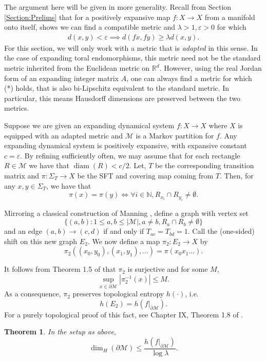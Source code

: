 \documentclass{article}
\def\N{\mathbb{N}}
\def\R{\mathbb{R}}
\def\M{\mathcal{M}}
\newtheorem{theorem}{Theorem}[section]
\begin{document}
The argument here will be given in more generality. Recall from Section \ref{Section:Prelims} that for a positively expansive map $f:X\to X$ from a manifold onto itself, \cite{CR} shows we can find a compatible metric and  $\lambda>1,\varepsilon>0$ for which \begin{align*}d(x,y)<\varepsilon \implies d(fx,fy)\geq \lambda d(x,y).\tag{*}\end{align*} For this section, we will only work with a metric that is \textit{adapted} in this sense. In the case of expanding toral endomorphisms, this metric need not be the standard metric inherited from the Euclidean metric on $\R^d$. However, using the real Jordan form of an expanding integer matrix $A$, one can always find a metric for which (*) holds, that is also bi-Lipschitz equivalent to the standard metric. In particular, this means Hausdorff dimensions are preserved between the two metrics.  

Suppose we are given an expanding dynamical system $f:X\to X$ where $X$ is equipped with an adapted metric and $\M$ is a Markov partition for $f$. Any expanding dynamical system is positively expansive, with expansive constant $c=\varepsilon$. By refining sufficiently often, we may assume that for each rectangle $R\in \M$ we have that $\operatorname{diam}(R) < c/2$. Let, $T$ be the corresponding transition matrix and $\pi:\Sigma_T\to X$ be the SFT and covering map coming from $T$. Then, for any $x,y\in \Sigma_T$, we have that $$\pi(x)=\pi(y) \iff \forall i\in \N, R_{x_i}\cap R_{y_i}\neq \emptyset.$$

Mirroring a classical construction of Manning \cite{M2}, define a graph with vertex set $$\{(a,b): 1\leq a,b \leq |\M|, a\neq b, R_a\cap R_b \neq \emptyset\}$$ and an edge $(a,b)\to (c,d)$ if and only if $T_{ac}=T_{bd}=1$. Call the (one-sided) shift on this new graph $E_2$. We now define a map $\pi_2:E_2\to X$ by $$\pi_2((x_0,y_0),(x_1,y_1),...) = \pi(x_0x_1...).$$

It follows from Theorem 1.5 of \cite{AKS} that $\pi_2$ is surjective and for some $M$, $$\sup_{x\in \partial\M} |\pi_2^{-1}(x)|\leq M.$$ As a consequence, $\pi_2$ preserves topological entropy $h(\cdot)$, i.e. $$h(E_2)=h(f|_{\partial\M}).$$ For a purely topological proof of this fact, see Chapter IX, Theorem 1.8 of \cite{Ro}.


\begin{theorem}\label{thm-dimH}
    In the setup as above, $$\dim_H(\partial\M)\leq\frac{h(f|_{\partial\M})}{\log \lambda}.$$ 
\end{theorem}
\end{document}
